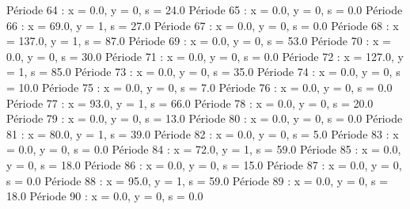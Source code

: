 Période 64 : x = 0.0, y = 0, s = 24.0
Période 65 : x = 0.0, y = 0, s = 0.0
Période 66 : x = 69.0, y = 1, s = 27.0
Période 67 : x = 0.0, y = 0, s = 0.0
Période 68 : x = 137.0, y = 1, s = 87.0
Période 69 : x = 0.0, y = 0, s = 53.0
Période 70 : x = 0.0, y = 0, s = 30.0
Période 71 : x = 0.0, y = 0, s = 0.0
Période 72 : x = 127.0, y = 1, s = 85.0
Période 73 : x = 0.0, y = 0, s = 35.0
Période 74 : x = 0.0, y = 0, s = 10.0
Période 75 : x = 0.0, y = 0, s = 7.0
Période 76 : x = 0.0, y = 0, s = 0.0
Période 77 : x = 93.0, y = 1, s = 66.0
Période 78 : x = 0.0, y = 0, s = 20.0
Période 79 : x = 0.0, y = 0, s = 13.0
Période 80 : x = 0.0, y = 0, s = 0.0
Période 81 : x = 80.0, y = 1, s = 39.0
Période 82 : x = 0.0, y = 0, s = 5.0
Période 83 : x = 0.0, y = 0, s = 0.0
Période 84 : x = 72.0, y = 1, s = 59.0
Période 85 : x = 0.0, y = 0, s = 18.0
Période 86 : x = 0.0, y = 0, s = 15.0
Période 87 : x = 0.0, y = 0, s = 0.0
Période 88 : x = 95.0, y = 1, s = 59.0
Période 89 : x = 0.0, y = 0, s = 18.0
Période 90 : x = 0.0, y = 0, s = 0.0



